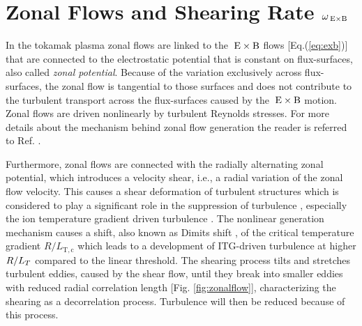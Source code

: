 \newpage
\section{Zonal Flows and Shearing Rate $\omega_{\mathrm{\:E \times B}}$}
\label{sec:zonalflow}

In the tokamak plasma zonal flows are linked to the $\mathrm{\:E}\times\mathrm{B}$ flows [Eq.(\ref{eq:exb})] that are connected to the electrostatic potential that is constant on flux-surfaces, also called \textit{zonal potential}. \cite{Diamond2005} Because of the variation exclusively across flux-surfaces, the zonal flow is tangential to those surfaces and does not contribute to the turbulent transport across the flux-surfaces caused by the $\mathrm{\:E}\times\mathrm{B}$ motion. 
Zonal flows are driven nonlinearly by turbulent Reynolds stresses. \cite{Diamond1991} For more details about the mechanism behind zonal flow generation the reader is referred to Ref. . \bigskip


Furthermore, zonal flows are connected with the radially alternating zonal potential, which introduces a velocity shear, i.e., a radial variation of the zonal flow velocity. This causes a shear deformation of turbulent structures which is considered to play a significant role in the suppression of turbulence \cite{Biglari1990, Dimits2000}, especially the ion temperature gradient driven turbulence \cite{Nakata2012, Makwana2014, Maeyama2014, Whelan2018, Whelan2019}. The nonlinear generation mechanism causes a shift, also known as Dimits shift \cite{Dimits2000}, of the critical temperature gradient $R/L_\mathrm{T,c}$ which leads to a development of ITG-driven turbulence at higher $R/L_T$ compared to the linear threshold. The shearing process tilts and stretches turbulent eddies, caused by the shear flow, until they break into smaller eddies with reduced radial correlation length [Fig. \ref{fig:zonalflow}],  characterizing the shearing as a decorrelation process. Turbulence will then be reduced because of this process. \cite{Biglari1990,Diamond2005,Burnell1997} \bigskip

\newpage

